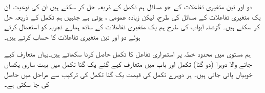 
دو اور تین متغیری تفاعلات  کے جو مسائل  ہم تکمل کے ذریعہ حل کر سکتے ہیں ان کی نوعیت ان یک متغیری تفاعلات کے مسائل کی طرح، لیکن زیادہ عمومی  ، ہوتی ہے جنہیں ہم تکمل کے ذریعہ حل کر سکتے  ہیں۔ گزشتہ ابواب کی طرح ہم  یک متغیری تفاعلات   کے ساتھ ہمارے  تجربہ کو  استعمال کرتے ہوئے  دو اور تین متغیری تفاعلات کا حساب کرتے  ہیں۔

ہم  مستوی  میں محدود  خطہ  پر استمراری تفاعل   کا تکمل حاصل کرنا سکھاتے ہیں۔یہاں متعارف کیے جانے والا  دوہرا  (دو گنا) تکمل اور باب  میں متعارف کیے گئے   یک گنا تکمل میں بہت ساری یکساں خوبیاں پائی جاتی ہیں۔ ہر دوہرے تکمل کی قیمت  یک گنا تکمل کی ترکیب سے مراحل میں حاصل کی  جا سکتی ہے۔

